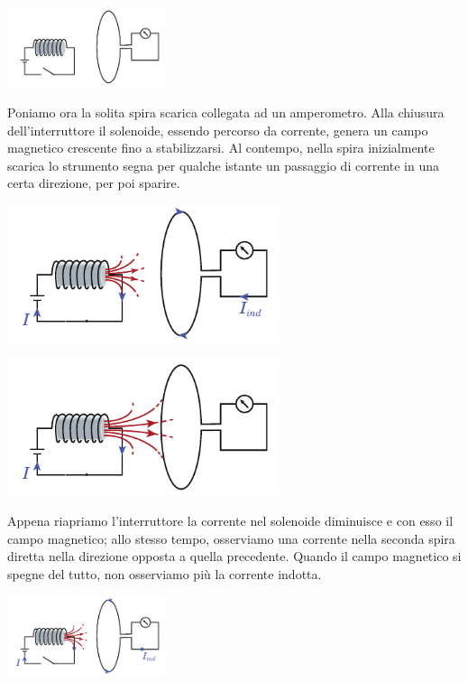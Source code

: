 \begin{itemize}
	\begin{center}
		\includegraphics[width=0.35\textwidth]{images/chp10/chp10esperimento3a.pdf}
	\end{center}
	Poniamo ora la solita spira scarica collegata ad un amperometro. Alla chiusura dell'interruttore il solenoide, essendo percorso da corrente, genera un campo magnetico crescente fino a stabilizzarsi. Al contempo, nella spira inizialmente scarica lo strumento segna per qualche istante un passaggio di corrente in una certa direzione, per poi sparire.\\
		\begin{minipage}{0.49\textwidth}
			\begin{center}
				\includegraphics[width=0.6\textwidth]{images/chp10/chp10esperimento3b.pdf}
			\end{center}
		\end{minipage}
		\begin{minipage}{0.49\textwidth}
			\begin{center}
				\includegraphics[width=0.6\textwidth]{images/chp10/chp10esperimento3c.pdf}
			\end{center}
		\end{minipage}
	Appena riapriamo l'interruttore la corrente nel solenoide diminuisce e con esso il campo magnetico; allo stesso tempo, osserviamo una corrente nella seconda spira diretta nella direzione opposta a quella precedente. Quando il campo magnetico si spegne del tutto, non osserviamo più la corrente indotta.
	\begin{center}
		\includegraphics[width=0.35\textwidth]{images/chp10/chp10esperimento3d.pdf}
	\end{center}
\end{itemize}

